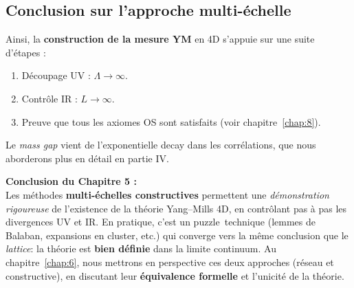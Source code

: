 \subsection*{Conclusion sur l’approche multi-échelle}
Ainsi, la \textbf{construction de la mesure YM} en 4D s’appuie sur une suite d’étapes :  
\begin{enumerate}
	\item Découpage UV : \(\Lambda \to \infty\).  
	\item Contrôle IR : \(L \to \infty\).  
	\item Preuve que tous les axiomes OS sont satisfaits (voir chapitre~\ref{chap:8}).  
\end{enumerate}
Le \emph{mass gap} vient de l’exponentielle decay dans les corrélations, que nous aborderons plus en détail en partie IV.

\vspace{2em}

\noindent
\textbf{Conclusion du Chapitre 5 :}\\
Les méthodes \textbf{multi-échelles constructives} permettent une \emph{démonstration rigoureuse} de l’existence de la théorie Yang--Mills 4D, en contrôlant pas à pas les divergences UV et IR. En pratique, c’est un \og puzzle\fg\ technique (lemmes de Balaban, expansions en cluster, etc.) qui converge vers la même conclusion que le \emph{lattice}: la théorie est \textbf{bien définie} dans la limite continuum.  
Au chapitre~\ref{chap:6}, nous mettrons en perspective ces deux approches (réseau et constructive), en discutant leur \textbf{équivalence formelle} et l’unicité de la théorie.

\vspace{2em}

